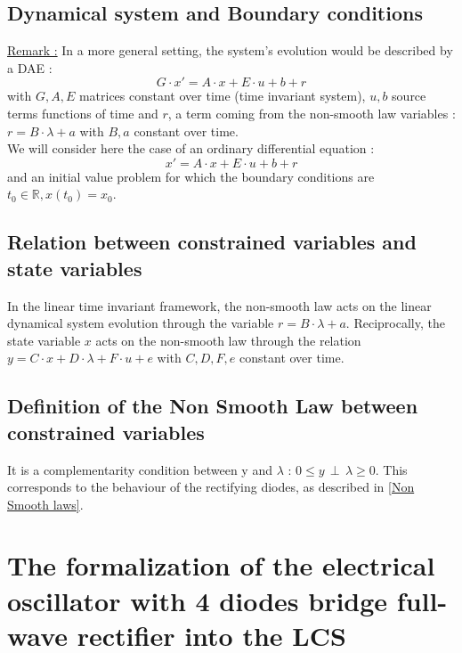 \documentclass[10pt]{article}
\begin{document}
\subsection{Dynamical system and Boundary conditions}
\underline{Remark :}
In a more general setting, the system's evolution would be described by a DAE :
\[
G \cdot x' = A \cdot x + E \cdot u + b + r
\]
with $G , A , E$ matrices constant over time (time invariant system), $u , b$ source terms functions of time and $r$,
a term coming from the non-smooth law variables : $r = B \cdot \lambda + a$ with $B , a$ constant over time.\\
We will consider here the case of an ordinary differential equation :
\[
x' = A \cdot x + E \cdot u + b + r
\]
and an initial value problem for which the boundary conditions are $t_0 \in \mathbb{R} , x(t_0)= x_0$.

\subsection{Relation between constrained variables and state variables}
In the linear time invariant framework, the non-smooth law acts on the linear dynamical system evolution through the variable
$r = B \cdot \lambda + a$. Reciprocally, the state variable $x$ acts on the non-smooth law through the relation
$y = C \cdot x + D \cdot \lambda + F \cdot u + e$ with $C , D , F , e$ constant over time.

\subsection{Definition of the Non Smooth Law between constrained variables}
It is a complementarity condition between y and $\lambda$ : $0 \leq y \, \perp \, \lambda \geq 0$. This corresponds
to the behaviour of the rectifying diodes, as described in \ref{Non Smooth laws}.

\section{The formalization of the electrical oscillator with 4 diodes bridge full-wave rectifier into the LCS}
\end{document}
